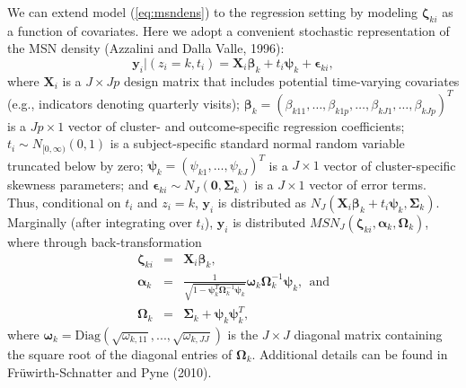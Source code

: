 \documentclass[useAMS,referee]{biom}
\begin{document}
We can extend model (\ref{eq:msndens}) to the regression setting by modeling $\boldsymbol\zeta_{ki}$ as a function of covariates. Here we adopt a convenient stochastic representation of the MSN density (Azzalini and Dalla Valle, 1996):
\begin{equation}
\mathbf{y}_{i}|(z_i=k,t_i) = \mathbf{X}_i \boldsymbol\beta_k + t_i \boldsymbol\psi_k + \boldsymbol\epsilon_{ki}, \label{eq:msnreg}
\end{equation}
where 
$\mathbf{X}_i$ is a $J \times Jp$ design matrix that includes potential time-varying covariates (e.g., indicators denoting quarterly visits); $\boldsymbol{\beta}_k=(\beta_{k11},\ldots,\beta_{k1p},\ldots,\beta_{kJ1},\ldots,\beta_{kJp})^T$ is a $Jp\times 1$ vector of cluster- and outcome-specific regression coefficients; $t_i\sim N_{[0,\infty)}(0,1)$ is a subject-specific standard normal random variable truncated below by zero; $\boldsymbol\psi_k=(\psi_{k1},\ldots,\psi_{kJ})^T$ is a $J \times 1$ vector of cluster-specific skewness parameters; and $\boldsymbol{\epsilon}_{ki} \sim N_J(\boldsymbol0,\boldsymbol\Sigma_k)$ is a $J\times 1$ vector of error terms. Thus, conditional on $t_i$ and $z_i=k$, $\boldsymbol{y}_i$ is distributed as $N_J(\mathbf{X}_i \boldsymbol\beta_k + t_i \boldsymbol\psi_k, \boldsymbol{\Sigma}_k)$. Marginally (after integrating over $t_i$), $\mathbf{y}_i$ is distributed $MSN_J(\boldsymbol\zeta_{ki}, \boldsymbol\alpha_k, \boldsymbol\Omega_k)$, where through back-transformation 
\begin{eqnarray*}
\boldsymbol\zeta_{ki} &=& \mathbf{X}_i\boldsymbol\beta_k,\\
\boldsymbol\alpha_k &=& \frac{1}{\sqrt{1 - \boldsymbol\psi_k^T 
\boldsymbol\Omega^{-1}_k\boldsymbol\psi_k}} \boldsymbol\omega_k \boldsymbol\Omega^{-1}_k\boldsymbol\psi_k,~~\text{and}\\
\boldsymbol\Omega_k &=& \boldsymbol\Sigma_k  + \boldsymbol\psi_k \boldsymbol\psi_k^T,
\end{eqnarray*}
where $\boldsymbol\omega_k = \text{Diag}(\sqrt{\omega_{k,11}},...,\sqrt{\omega_{k,JJ}})$ is the $J \times J$ diagonal matrix containing the square root of the diagonal entries of $\boldsymbol\Omega_k$. Additional details can be found in Fr\"{u}wirth-Schnatter and Pyne (2010). 
\end{document}
